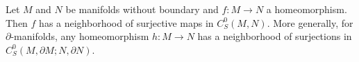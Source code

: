 Let $M$ and $N$ be manifolds without boundary and $f: M \to N$ a homeomorphism. Then $f$ has a neighborhood of surjective maps in $C^0_S(M,N)$. More generally, for $\partial$-manifolds, any homeomorphism $h: M \to N$ has a neighborhood of surjections in $C^0_S(M, \partial M; N, \partial N)$.
